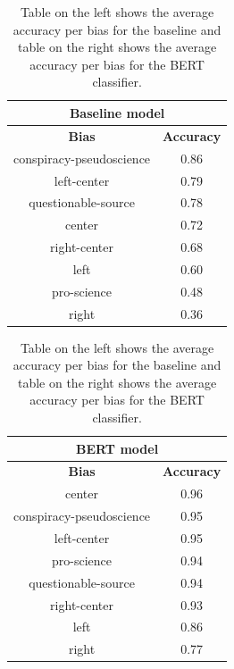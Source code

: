 \begin{table}[H]
    \centering
\begin{tabular}{|c|c|}
\multicolumn{2}{c}{\cellcolor[HTML]{FFCCC9}\textbf{Baseline model}} \\ \hline
\textbf{Bias}            & \textbf{Accuracy} \\ \hline
conspiracy-pseudoscience & 0.86              \\ \hline
left-center              & 0.79              \\ \hline
questionable-source      & 0.78              \\ \hline
center                   & 0.72              \\ \hline
right-center             & 0.68              \\ \hline
left                     & 0.60              \\ \hline
pro-science              & 0.48              \\ \hline
right                    & 0.36              \\ \hline
\end{tabular}
\quad
\begin{tabular}{|c|c|}
\multicolumn{2}{c}{\cellcolor[HTML]{DAE8FC}\textbf{BERT model}} \\ \hline
\textbf{Bias}            & \textbf{Accuracy} \\ \hline
center                   & 0.96              \\ \hline
conspiracy-pseudoscience & 0.95              \\ \hline
left-center              & 0.95              \\ \hline
pro-science              & 0.94              \\ \hline
questionable-source      & 0.94              \\ \hline
right-center             & 0.93              \\ \hline
left                     & 0.86              \\ \hline
right                    & 0.77              \\ \hline
\end{tabular}
    \caption{Table on the left shows the average accuracy per bias for the baseline and table on the right shows the average accuracy per bias for the BERT classifier.}
    \label{tab:acc_per_bias_fact}
\end{table}

